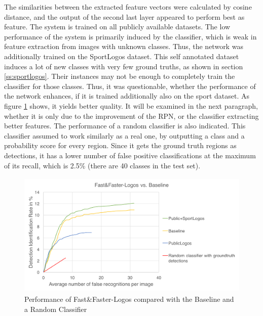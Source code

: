 The similarities between the extracted feature vectors were calculated by cosine distance, and the output of the second last layer appeared to perform best as feature. The system is trained on all publicly available datasets. The low performance of the system is primarily induced by the classifier, which is weak in feature extraction from images with unknown classes. Thus, the network was additionally trained on the SportLogos dataset. This self annotated dataset induces a lot of new classes with very few ground truths, as shown in section \ref{ss:sportlogos}. Their instances may not be enough to completely train the classifier for those classes. Thus, it was questionable, whether the performance of the network enhances, if it is trained additionally also on the sport dataset. As figure \ref{f:sol2} shows, it yields better quality. It will be examined in the next paragraph, whether it is only due to the improvement of the RPN, or the classifier extracting better features. The performance of a random classifier is also indicated. This classifier assumed to work similarly as a real one, by outputting a class and a probability score for every region. Since it gets the ground truth regions as detections, it has a lower number of false positive classifications at the maximum of its recall, which is 2.5\% (there are 40 classes in the test set).
\begin{figure}
  \centering
  \includegraphics[height=60mm]{images/mt/sol2.png}
  \caption{Performance of Fast\&Faster-Logos compared with the Baseline and a Random Classifier}
  \label{f:sol2}
\end{figure}

